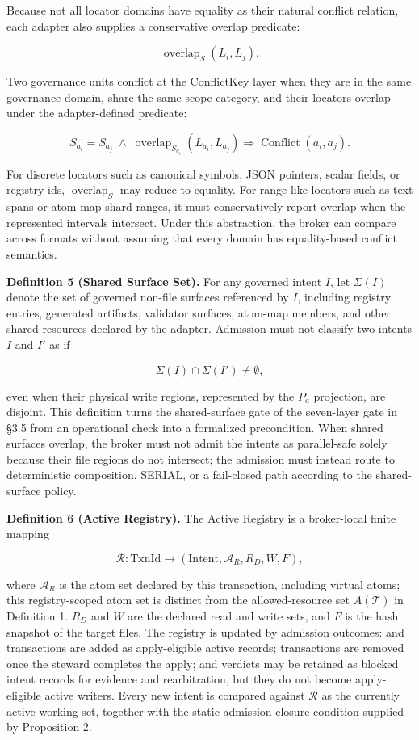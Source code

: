 \documentclass[9pt,letterpaper]{extarticle}
\begin{document}
Because not all locator domains have equality as their natural conflict relation, each adapter also supplies a conservative overlap predicate:

\[
\operatorname{overlap}_{S}(L_i, L_j).
\]

Two governance units conflict at the ConflictKey layer when they are in the same governance domain, share the same scope category, and their locators overlap under the adapter-defined predicate:

\[
S_{a_i} = S_{a_j}
\;\land\;
\operatorname{overlap}_{S_{a_i}}(L_{a_i}, L_{a_j})
\Rightarrow
\operatorname{Conflict}(a_i, a_j).
\]

For discrete locators such as canonical symbols, JSON pointers, scalar fields, or registry ids, $\operatorname{overlap}_{S}$ may reduce to equality. For range-like locators such as text spans or atom-map shard ranges, it must conservatively report overlap when the represented intervals intersect. Under this abstraction, the broker can compare across formats without assuming that every domain has equality-based conflict semantics.

\textbf{Definition 5 (Shared Surface Set).} For any governed intent $I$, let $\Sigma(I)$ denote the set of governed non-file surfaces referenced by $I$, including registry entries, generated artifacts, validator surfaces, atom-map members, and other shared resources declared by the adapter. Admission must not classify two intents $I$ and $I'$ as \texttt{} if

\[
\Sigma(I) \cap \Sigma(I') \neq \emptyset,
\]

even when their physical write regions, represented by the $P_a$ projection, are disjoint. This definition turns the shared-surface gate of the seven-layer gate in §3.5 from an operational check into a formalized precondition. When shared surfaces overlap, the broker must not admit the intents as parallel-safe solely because their file regions do not intersect; the admission must instead route to deterministic composition, SERIAL, or a fail-closed path according to the shared-surface policy.

\textbf{Definition 6 (Active Registry).} The Active Registry is a broker-local finite mapping

\[
\mathcal{R} : \text{TxnId} \to (\text{Intent}, \mathcal{A}_R, R_D, W, F),
\]

where $\mathcal{A}_R$ is the atom set declared by this transaction, including virtual atoms; this registry-scoped atom set is distinct from the allowed-resource set $A(\mathcal{T})$ in Definition 1. $R_D$ and $W$ are the declared read and write sets, and $F$ is the hash snapshot of the target files. The registry is updated by admission outcomes: \texttt{} and \texttt{} transactions are added as apply-eligible active records; transactions are removed once the steward completes the apply; and \texttt{} verdicts may be retained as blocked intent records for evidence and rearbitration, but they do not become apply-eligible active writers. Every new intent is compared against $\mathcal{R}$ as the currently active working set, together with the static admission closure condition supplied by Proposition 2.
\end{document}
